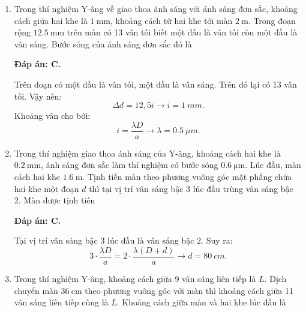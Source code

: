 \begin{enumerate}[label=\bfseries Câu \arabic*:]
{	}
	
\item {}
		\cauhoi
	{Trong thí nghiệm Y-âng về giao thoa ánh sáng với ánh sáng đơn sắc, khoảng cách giữa hai khe là $\SI{1}{\milli \meter}$, khoảng cách từ hai khe tới màn $\SI{2}{\meter}$. Trong đoạn rộng $\SI{12.5}{\milli \meter}$ trên màn có 13 vân tối biết một đầu là vân tối còn một đầu là vân sáng. Bước sóng của ánh sáng đơn sắc đó là
	}
	
	\loigiai
	{		\textbf{Đáp án: C.}
		
Trên đoạn có một đầu là vân tối, một đầu là vân sáng. Trên đó lại có $ 13 $ vân tối. Vậy nên:
$$
	\Delta d = 12,5i \rightarrow i = \SI{1}{mm}.
$$
Khoảng vân cho bởi:
$$
	i = \dfrac{\lambda D}{a} \rightarrow \lambda = \SI{0,5}{\mu m}.
$$
		
	}
	
	\item {}
		\cauhoi
	{Trong thí nghiệm giao thoa ánh sáng của Y-âng, khoảng cách hai khe là $\SI{0.2}{\milli \meter}$, ánh sáng đơn sắc làm thí nghiệm có bước sóng $\SI{0.6}{\micro \meter}$. Lúc đầu, màn cách hai khe $\SI{1.6}{\meter}$. Tịnh tiến màn theo phương vuông góc mặt phẳng chứa hai khe một đoạn $d$ thì tại vị trí vân sáng bậc 3 lúc đầu trùng vân sáng bậc 2. Màn được tịnh tiến
	}
	
	\loigiai
	{		\textbf{Đáp án: C.}
		
Tại vị trí vân sáng bậc $ 3 $ lúc đầu là vân sáng bậc $ 2 $. Suy ra:
$$
	3 \cdot \dfrac{\lambda D}{a} = 2 \cdot \dfrac{\lambda (D+d)}{a} \rightarrow d = \SI{80}{cm}.
$$
		
	}
	
	\item {} 
		\cauhoi
	{Trong thí nghiệm Y-âng, khoảng cách giữa 9 vân sáng liên tiếp là $L$. Dịch chuyển màn $\SI{36}{\centi \meter}$ theo phương vuông góc với màn thì khoảng cách giữa 11 vân sáng liên tiếp cũng là $L$. Khoảng cách giữa màn và hai khe lúc đầu là
	}
	

\end{enumerate}
